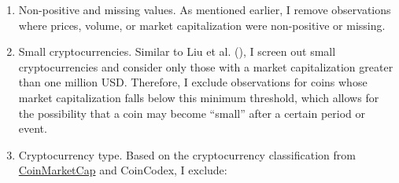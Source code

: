 \documentclass[
  12pt,
  a4paper,
  openany]{scrbook}
\begin{document}
\begin{enumerate}
\def\labelenumi{\arabic{enumi}.}
\item
  Non-positive and missing values. As mentioned earlier, I remove
  observations where prices, volume, or market capitalization were
  non-positive or missing.
\item
  Small cryptocurrencies. Similar to Liu et al.
  (), I screen out small
  cryptocurrencies and consider only those with a market capitalization
  greater than one million USD. Therefore, I exclude observations for
  coins whose market capitalization falls below this minimum threshold,
  which allows for the possibility that a coin may become ``small''
  after a certain period or event.
\item
  Cryptocurrency type. Based on the cryptocurrency classification from
  \href{https://coinmarketcap.com/cryptocurrency-category/}{CoinMarketCap}
  and CoinCodex, I exclude:


\end{enumerate}
\end{document}
